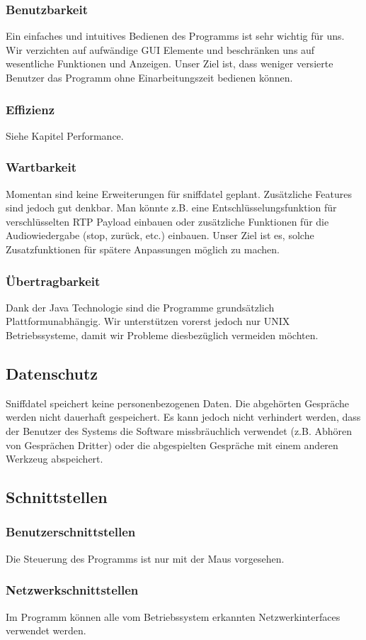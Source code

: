 \documentclass[a4,12pt]{scrartcl}
\begin{document}
\subsubsection{Benutzbarkeit}
Ein einfaches und intuitives Bedienen des Programms ist sehr wichtig für uns. Wir verzichten auf aufwändige GUI Elemente und beschränken uns auf wesentliche Funktionen und Anzeigen. Unser Ziel ist, dass weniger versierte Benutzer das Programm ohne Einarbeitungszeit bedienen können. 
\subsubsection{Effizienz}
Siehe Kapitel Performance.
\subsubsection{Wartbarkeit}
Momentan sind keine Erweiterungen für sniffdatel geplant. Zusätzliche Features sind jedoch gut denkbar. Man könnte z.B. eine Entschlüsselungsfunktion für verschlüsselten RTP Payload einbauen oder zusätzliche Funktionen für die Audiowiedergabe (stop, zurück, etc.) einbauen. Unser Ziel ist es, solche Zusatzfunktionen für spätere Anpassungen möglich zu machen.
\subsubsection{Übertragbarkeit}
Dank der Java Technologie sind die Programme grundsätzlich Plattformunabhängig. Wir unterstützen vorerst jedoch nur UNIX Betriebssysteme, damit wir Probleme diesbezüglich vermeiden möchten.
\subsection{Datenschutz}
Sniffdatel speichert keine personenbezogenen Daten. Die abgehörten Gespräche werden nicht dauerhaft gespeichert. Es kann jedoch nicht verhindert werden, dass der Benutzer des Systems die Software missbräuchlich verwendet (z.B. Abhören von Gesprächen Dritter) oder die abgespielten Gespräche mit einem anderen Werkzeug abspeichert.
\subsection{Schnittstellen}
\subsubsection{Benutzerschnittstellen}
Die Steuerung des Programms ist nur mit der Maus vorgesehen.
\subsubsection{Netzwerkschnittstellen}
Im Programm können alle vom Betriebssystem erkannten Netzwerkinterfaces verwendet werden.
\end{document}
